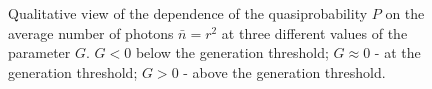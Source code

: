 \begin{figure}
\centering



\caption{Qualitative view of the dependence of the quasiprobability $P$ on the average
  number of photons $\bar{n} = r^2$ at three different values of the parameter
  $G$. $G < 0$ below the generation threshold; $G \approx 0$ - at the generation threshold; $G > 0$ - above the generation threshold.}
\label{figPart2Ch1_6}
\end{figure}